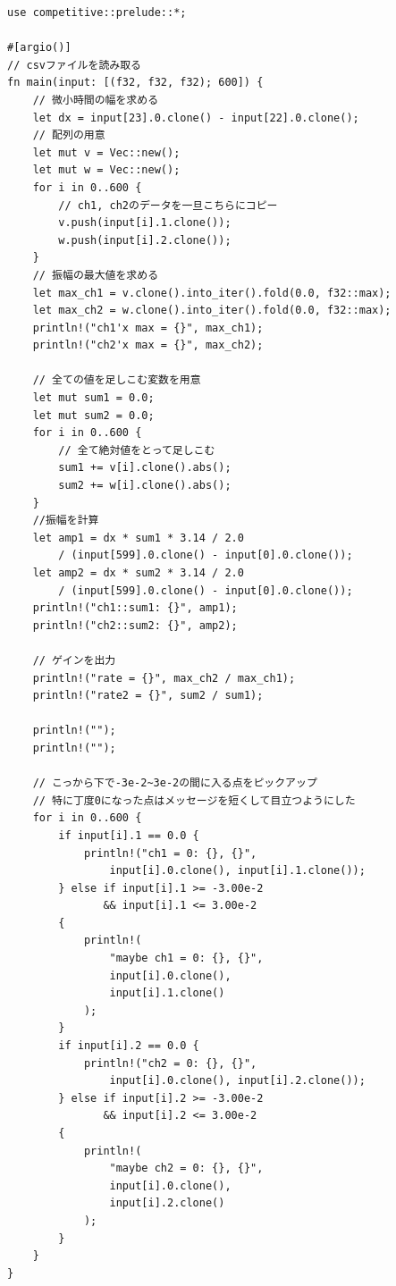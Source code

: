 \documentclass[uplatex, 11pt,a4j, titlepage]{jsarticle}
\begin{document}
\begin{lstlisting}[caption={csv\_manager.rs}]
    use competitive::prelude::*;

#[argio()]
// csvファイルを読み取る
fn main(input: [(f32, f32, f32); 600]) {
    // 微小時間の幅を求める
    let dx = input[23].0.clone() - input[22].0.clone(); 
    // 配列の用意
    let mut v = Vec::new(); 
    let mut w = Vec::new();
    for i in 0..600 {
        // ch1, ch2のデータを一旦こちらにコピー
        v.push(input[i].1.clone()); 
        w.push(input[i].2.clone());
    }
    // 振幅の最大値を求める
    let max_ch1 = v.clone().into_iter().fold(0.0, f32::max); 
    let max_ch2 = w.clone().into_iter().fold(0.0, f32::max);
    println!("ch1'x max = {}", max_ch1);
    println!("ch2'x max = {}", max_ch2);

    // 全ての値を足しこむ変数を用意
    let mut sum1 = 0.0; 
    let mut sum2 = 0.0;
    for i in 0..600 {
        // 全て絶対値をとって足しこむ
        sum1 += v[i].clone().abs(); 
        sum2 += w[i].clone().abs();
    }
    //振幅を計算 
    let amp1 = dx * sum1 * 3.14 / 2.0 
        / (input[599].0.clone() - input[0].0.clone()); 
    let amp2 = dx * sum2 * 3.14 / 2.0 
        / (input[599].0.clone() - input[0].0.clone());
    println!("ch1::sum1: {}", amp1);
    println!("ch2::sum2: {}", amp2);

    // ゲインを出力
    println!("rate = {}", max_ch2 / max_ch1); 
    println!("rate2 = {}", sum2 / sum1);

    println!("");
    println!("");

    // こっから下で-3e-2~3e-2の間に入る点をピックアップ
    // 特に丁度0になった点はメッセージを短くして目立つようにした
    for i in 0..600 {
        if input[i].1 == 0.0 {
            println!("ch1 = 0: {}, {}", 
                input[i].0.clone(), input[i].1.clone());
        } else if input[i].1 >= -3.00e-2 
               && input[i].1 <= 3.00e-2 
        {
            println!(
                "maybe ch1 = 0: {}, {}",
                input[i].0.clone(),
                input[i].1.clone()
            );
        }
        if input[i].2 == 0.0 {
            println!("ch2 = 0: {}, {}", 
                input[i].0.clone(), input[i].2.clone());
        } else if input[i].2 >= -3.00e-2 
               && input[i].2 <= 3.00e-2 
        {
            println!(
                "maybe ch2 = 0: {}, {}",
                input[i].0.clone(),
                input[i].2.clone()
            );
        }
    }
}
\end{lstlisting}
\end{document}
